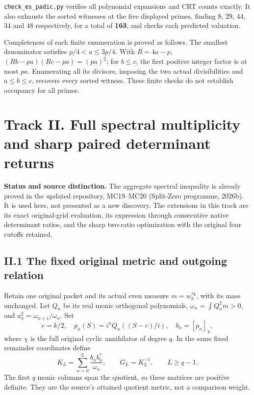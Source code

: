 \texttt{check\_es\_padic.py} verifies all polynomial expansions and CRT
counts exactly. It also exhausts the sorted witnesses at the five
displayed primes, finding 8, 29, 44, 34 and 48 respectively, for a total
of \textbf{163}, and checks each predicted valuation.

Completeness of each finite enumeration is proved as follows. The
smallest denominator satisfies \(p/4<a\le3p/4\). With \(R=4a-p\),
\((Rb-pa)(Rc-pa)=(pa)^2\); for \(b\le c\), the first positive integer
factor is at most \(pa\). Enumerating all its divisors, imposing the two
actual divisibilities and \(a\le b\le c\), recovers every sorted
witness. These finite checks do not establish occupancy for all primes.

\newpage

\section{Track II. Full spectral multiplicity and sharp paired
determinant
returns}\label{track-ii.-full-spectral-multiplicity-and-sharp-paired-determinant-returns}

\textbf{Status and source distinction.} The aggregate spectral
inequality is already proved in the updated repository, MC19--MC20
(Split-Zero programme, 2026b). It is used here, not presented as a new
discovery. The extensions in this track are its exact original-grid
evaluation, its expression through consecutive native determinant
ratios, and the sharp two-ratio optimization with the original four
cutoffs retained.

\subsection{II.1 The fixed original metric and outgoing
relation}\label{ii.1-the-fixed-original-metric-and-outgoing-relation}

Retain one original packet and its actual even measure \(m=w_h^{*k}\),
with its mass unchanged. Let \(Q_n\) be its real monic orthogonal
polynomials, \(\omega_n=\int Q_n^2m>0\), and
\(a_n^2=\omega_{n+1}/\omega_n\). Set \[
c=k/2,\quad p_n(S)=i^nQ_n((S-c)/i),\quad b_n=[p_n]_\chi,
\] where \(\chi\) is the full original cyclic annihilator of degree
\(q\). In the same fixed remainder coordinates define \[
K_L=\sum_{n=0}^L\frac{b_nb_n^*}{\omega_n},\qquad
G_L=K_L^{-1},\qquad L\ge q-1.
\tag{D1}
\] The first \(q\) monic columns span the quotient, so these matrices
are positive definite. They are the source's attained quotient metric,
not a comparison weight.

